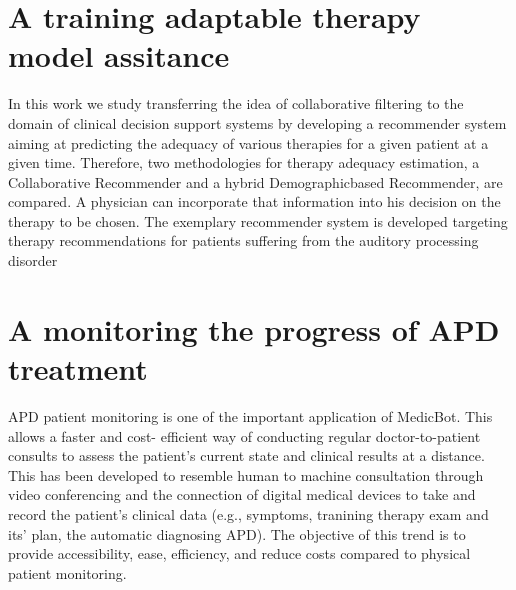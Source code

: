 \documentclass[letterpaper%
, twoside%
, 12pt%
,these%
, english%
,creativecommons,hyperref%
]{thETS}
\begin{document}
\section{A training adaptable therapy model assitance}
In this work we study transferring the idea of collaborative filtering to the domain of clinical
decision support systems by developing a recommender system aiming at predicting the adequacy
of various therapies for a given patient at a given time. Therefore, two methodologies for
therapy adequacy estimation, a Collaborative Recommender and a hybrid Demographicbased
Recommender, are compared. A physician can incorporate that information into his decision
on the therapy to be chosen. The exemplary recommender system is developed targeting therapy
recommendations for patients suffering from the auditory processing disorder

\section{ A monitoring the progress of APD treatment}
APD patient monitoring is one of the important application of MedicBot. This allows a faster
and cost- efficient way of conducting regular doctor-to-patient consults to assess the patient’s
current state and clinical results at a distance. This has been developed to resemble human to
machine consultation through video conferencing and the connection of digital medical devices
to take and record the patient’s clinical data (e.g., symptoms, tranining therapy exam and its’
plan, the automatic diagnosing APD). The objective of this trend is to provide accessibility,
ease, efficiency, and reduce costs compared to physical patient monitoring.

\end{document}

